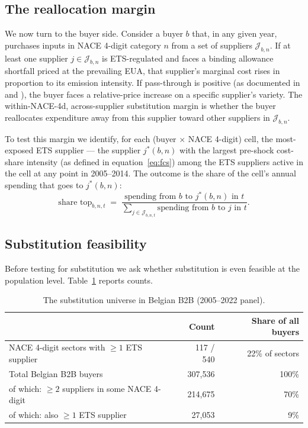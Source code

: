 \subsection{The reallocation margin}

We now turn to the buyer side. Consider a buyer $b$ that, in any given year, purchases inputs in NACE 4-digit category $n$ from a set of suppliers $\mathcal{J}_{b,n}$. If at least one supplier $j \in \mathcal{J}_{b,n}$ is ETS-regulated and faces a binding allowance shortfall priced at the prevailing EUA, that supplier's marginal cost rises in proportion to its emission intensity. If pass-through is positive (as documented in \citealp{colmeretal2023} and \citealp{kanzig2023unequal}), the buyer faces a relative-price increase on a specific supplier's variety. The within-NACE-4d, across-supplier substitution margin is whether the buyer reallocates expenditure away from this supplier toward other suppliers in $\mathcal{J}_{b,n}$.

To test this margin we identify, for each (buyer $\times$ NACE 4-digit) cell, the most-exposed ETS supplier --- the supplier $j^*(b,n)$ with the largest pre-shock cost-share intensity (as defined in equation~\ref{eq:fcs}) among the ETS suppliers active in the cell at any point in 2005--2014. The outcome is the share of the cell's annual spending that goes to $j^*(b,n)$:
\begin{equation}
    \text{share top}_{b,n,t} \;=\; \frac{\text{spending from } b \text{ to } j^*(b,n) \text{ in } t}{\sum_{j \in \mathcal{J}_{b,n,t}} \text{spending from } b \text{ to } j \text{ in } t}.
    \label{eq:share_top}
\end{equation}

\subsection{Substitution feasibility}

Before testing for substitution we ask whether substitution is even feasible at the population level. Table~\ref{tab:substitution_universe} reports counts.

\begin{table}[H]
    \centering
    \caption{The substitution universe in Belgian B2B (2005--2022 panel).}
    \label{tab:substitution_universe}
    \begin{tabular}{lrr}
        \toprule
        & Count & Share of all buyers \\
        \midrule
        NACE 4-digit sectors with $\geq 1$ ETS supplier      &   117 / 540 & 22\% of sectors \\
        Total Belgian B2B buyers                              & 307{,}536 & 100\% \\
        \quad of which: $\geq 2$ suppliers in some NACE 4-digit & 214{,}675 & 70\% \\
        \quad \quad of which: also $\geq 1$ ETS supplier        &  27{,}053 & 9\% \\
        \bottomrule
    \end{tabular}
\end{table}

